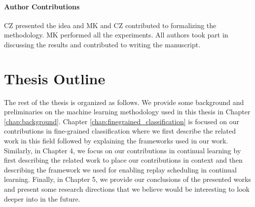 \paragraph{Author Contributions} 
CZ presented the idea and MK and CZ contributed to formalizing the methodology. 
MK performed all the experiments. 
All authors took part in discussing the results and contributed to writing the manuscript. 



\section{Thesis Outline}\label{sec:outline}
The rest of the thesis is organized as follows. We provide some background and preliminaries on the machine learning methodology used in this thesis in Chapter \ref{chap:background}. Chapter \ref{chap:finegrained_classification} is focused on our contributions in fine-grained classification where we first describe the related work in this field followed by explaining the frameworks used in our work. Similarly, in Chapter 4, we focus on our contributions in continual learning by first describing the related work to place our contributions in context and then describing the framework we used for enabling replay scheduling in continual learning. Finally, in Chapter 5, we provide our conclusions of the presented works and present some research directions that we believe would be interesting to look deeper into in the future. 

